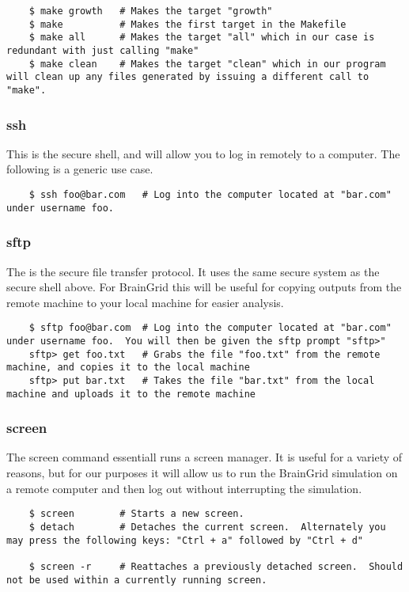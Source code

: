 	\begin{lstlisting}
	$ make growth	# Makes the target "growth"
	$ make			# Makes the first target in the Makefile
	$ make all		# Makes the target "all" which in our case is redundant with just calling "make"
	$ make clean	# Makes the target "clean" which in our program will clean up any files generated by issuing a different call to "make".
	\end{lstlisting}


\subsubsection{ssh} \mdseries
This is the secure shell, and will allow you to log in remotely to a computer.  The following is a generic use case.

	\begin{lstlisting}
	$ ssh foo@bar.com	# Log into the computer located at "bar.com" under username foo.
	\end{lstlisting}
	
	
\subsubsection{sftp} \mdseries
The is the secure file transfer protocol.  It uses the same secure system as the secure shell above.  For BrainGrid this will be useful for copying outputs from the remote machine to your local machine for easier analysis.

	\begin{lstlisting}
	$ sftp foo@bar.com	# Log into the computer located at "bar.com" under username foo.  You will then be given the sftp prompt "sftp>"
	sftp> get foo.txt	# Grabs the file "foo.txt" from the remote machine, and copies it to the local machine
	sftp> put bar.txt	# Takes the file "bar.txt" from the local machine and uploads it to the remote machine
	\end{lstlisting}

\subsubsection{screen} \mdseries
The screen command essentiall runs a screen manager.  It is useful for a variety of reasons, but for our purposes it will allow us to run the BrainGrid simulation on a remote computer and then log out without interrupting the simulation.

	\begin{lstlisting}
	$ screen		# Starts a new screen.
	$ detach		# Detaches the current screen.  Alternately you may press the following keys: "Ctrl + a" followed by "Ctrl + d"
	
	$ screen -r 	# Reattaches a previously detached screen.  Should not be used within a currently running screen.
	\end{lstlisting}

